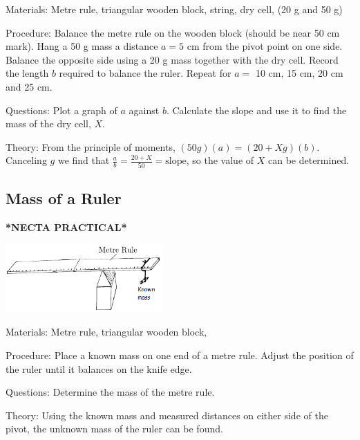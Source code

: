 \begin{multicols}{2}
\begin{description*}
\item[Materials:]{Metre rule, triangular wooden block, string, dry cell,  (20 g and 50 g)}
\item[Procedure:]{Balance the metre rule on the wooden block (should be near 50 cm mark). Hang a 50 g mass a distance $a=5$ cm from the pivot point on one side. Balance the opposite side using a 20 g mass together with the dry cell. Record the length $b$ required to balance the ruler. Repeat for $a =$ 10 cm, 15 cm, 20 cm and 25 cm.}
\item[Questions:]{Plot a graph of $a$ against $b$. Calculate the slope and use it to find the mass of the dry cell, $X$.}
\item[Theory:]{From the principle of moments, $(50 g)(a) = (20 + X g)(b)$. Canceling $g$ we find that $\frac{a}{b} = \frac{20 + X}{50} = \text{slope}$, so the value of $X$ can be determined.}
\end{description*}

\subsection{Mass of a Ruler}
\textbf{*NECTA PRACTICAL*}

\begin{center}
\includegraphics[width=0.45\textwidth]{./img/mass-of-ruler.png}
\end{center}

\begin{description*}
\item[Materials:]{Metre rule, triangular wooden block, }
\item[Procedure:]{Place a known mass on one end of a metre rule. Adjust the position of the ruler until it balances on the knife edge.}
\item[Questions:]{Determine the mass of the metre rule.}
\item[Theory:]{Using the known mass and measured distances on either side of the pivot, the unknown mass of the ruler can be found.}
\end{description*}


\end{multicols}
